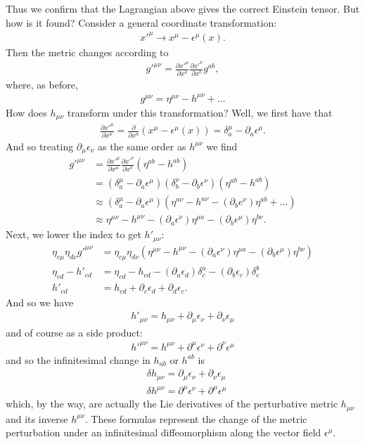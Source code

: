 \documentclass{book}
\theoremstyle{definition}
\newcommand{\p}{\partial}
\newcommand{\nn}{\nonumber}
\newcommand{\f}[2]{\frac{#1}{#2}}
\newcommand{\lp}{\left(}
\newcommand{\rp}{\right)}
\begin{document}
Thus we confirm that the Lagrangian above gives the correct Einstein tensor. But how is it found? Consider a general coordinate transformation:
\begin{align}
x'^\mu \to x^\mu - \epsilon^\mu(x).
\end{align}
Then the metric changes according to 
\begin{align}
g'^{\mu\nu} = \f{\p x'^\mu}{\p x^a} \f{\p x'^\nu}{\p x^b} g^{ab},
\end{align}
where, as before,
\begin{align}
g^{\mu\nu} = \eta^{\mu\nu} - h^{\mu\nu} +\dots
\end{align}
How does $h_{\mu\nu}$ transform under this transformation? Well, we first have that
\begin{align}
\f{\p x'^\mu}{\p x^a}= \f{\p}{\p x^a} (x^\mu - \epsilon^\mu(x)) = \delta^\mu_a - \p_a \epsilon^\mu.
\end{align}
And so treating $\p_\mu \epsilon_\nu$ as the same order as $h^{\mu\nu}$ we find
\begin{align}
g'^{\mu\nu} &= \f{\p x'^\mu}{\p x^a} \f{\p x'^\nu}{\p x^b}\lp \eta^{ab} - h^{ab} \rp\nn\\
&= (\delta^\mu_a - \p_a\epsilon^\mu)(\delta^\nu_b - \p_b\epsilon^\nu)\lp \eta^{ab} - h^{ab} \rp\nn\\
&\approx (\delta^\mu_a - \p_a\epsilon^\mu)(\eta^{a\nu} - h^{a\nu} - (\p_b e^\nu)\eta^{ab}+\dots\nn)\\
&\approx \eta^{\mu\nu} - h^{\mu\nu} - (\p_a \epsilon^\nu)\eta^{\mu a} - (\p_b \epsilon^\mu)\eta^{b\nu}.
\end{align}
Next, we lower the index to get $h'_{\mu\nu}$:
\begin{align}
\eta_{c\mu}\eta_{d\nu}g'^{\mu\nu} &= \eta_{c\mu}\eta_{d\nu}\lp \eta^{\mu\nu} - h^{\mu\nu} - (\p_a \epsilon^\nu)\eta^{\mu a} - (\p_b \epsilon^\mu)\eta^{b\nu} \rp\nn\\
\eta_{cd} - h'_{cd} &= \eta_{cd} - h_{cd} - (\p_a \epsilon_d)\delta^a_c - (\p_b\epsilon_c)\delta^b_c\nn\\
h'_{cd} &= h_{cd} + \p_c \epsilon_d +  \p_d \epsilon_c. 
\end{align}
And so we have
\begin{align}
\boxed{h'_{\mu\nu}= h_{\mu\nu} + \p_\mu \epsilon_\nu + \p_\nu \epsilon_\mu}
\end{align}
and of course as a side product:
\begin{align}
\boxed{h'^{\mu\nu} = h^{\mu\nu} + \p^\mu \epsilon^\nu + \p^\nu \epsilon^\mu}
\end{align}
and so the infinitesimal change in $h_{ab}$ or $h^{ab}$ is
\begin{align}
&\boxed{\delta h_{\mu\nu} = \p_\mu \epsilon_\nu + \p_\nu \epsilon_\mu}\\
&\boxed{\delta h^{\mu\nu} = \p^\mu \epsilon^\nu + \p^\mu \epsilon^\mu}
\end{align}
which, by the way, are actually the Lie  derivatives of the perturbative metric $h_{\mu\nu}$ and its inverse $h^{\mu\nu}$. These formulas represent the change of the metric perturbation under an infinitesimal diffeomorphism along the vector field $\epsilon^\mu$. \\ 
\end{document}
